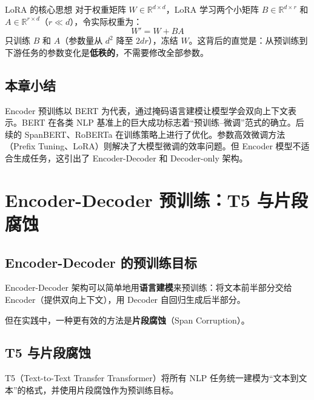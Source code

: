 \documentclass[a4paper]{article}
\begin{document}
\begin{importantbox}{LoRA 的核心思想}
对于权重矩阵 $W \in \mathbb{R}^{d \times d}$，LoRA 学习两个小矩阵 $B \in \mathbb{R}^{d \times r}$ 和 $A \in \mathbb{R}^{r \times d}$（$r \ll d$），令实际权重为：
$$W' = W + BA$$
只训练 $B$ 和 $A$（参数量从 $d^2$ 降至 $2dr$），冻结 $W$。这背后的直觉是：从预训练到下游任务的参数变化是\textbf{低秩的}，不需要修改全部参数。
\end{importantbox}

\subsection{本章小结}

Encoder 预训练以 BERT 为代表，通过掩码语言建模让模型学会双向上下文表示。BERT 在各类 NLP 基准上的巨大成功标志着``预训练--微调''范式的确立。后续的 SpanBERT、RoBERTa 在训练策略上进行了优化。参数高效微调方法（Prefix Tuning、LoRA）则解决了大模型微调的效率问题。但 Encoder 模型不适合生成任务，这引出了 Encoder-Decoder 和 Decoder-only 架构。


\section{Encoder-Decoder 预训练：T5 与片段腐蚀}

\subsection{Encoder-Decoder 的预训练目标}

Encoder-Decoder 架构可以简单地用\textbf{语言建模}来预训练：将文本前半部分交给 Encoder（提供双向上下文），用 Decoder 自回归生成后半部分。




但在实践中，一种更有效的方法是\textbf{片段腐蚀}（Span Corruption）。

\subsection{T5 与片段腐蚀}

T5（Text-to-Text Transfer Transformer）将所有 NLP 任务统一建模为``文本到文本''的格式，并使用片段腐蚀作为预训练目标。


\end{document}
